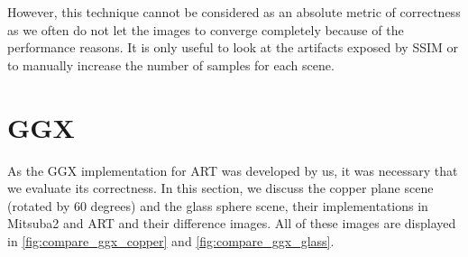 However, this technique cannot be considered as an absolute metric of correctness as we often do not let the images to converge completely because of the performance reasons. It is only useful to look at the artifacts exposed by SSIM or to manually increase the number of samples for each scene. 

\section{GGX}

As the GGX implementation for ART was developed by us, it was necessary that we evaluate its correctness. In this section, we discuss the copper plane scene (rotated by 60 degrees) and the glass sphere scene, their implementations in Mitsuba2 and ART and their difference images. All of these images are displayed in \autoref{fig:compare_ggx_copper} and \autoref{fig:compare_ggx_glass}.

